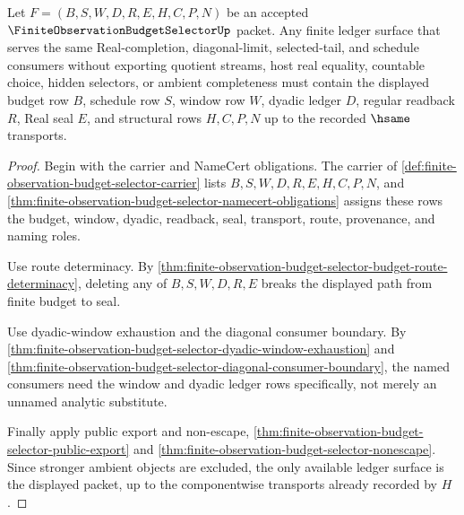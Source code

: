 \begin{theorem}
\label{thm:finite-observation-budget-selector-budget-ledger-minimality}
Let $F=(B,S,W,D,R,E,H,C,P,N)$ be an accepted $\FiniteObservationBudgetSelectorUp$ packet. Any finite ledger surface that serves the same Real-completion, diagonal-limit, selected-tail, and schedule consumers without exporting quotient streams, host real equality, countable choice, hidden selectors, or ambient completeness must contain the displayed budget row $B$, schedule row $S$, window row $W$, dyadic ledger $D$, regular readback $R$, Real seal $E$, and structural rows $H,C,P,N$ up to the recorded $\hsame$ transports.
\end{theorem}
\begin{proof}
Begin with the carrier and NameCert obligations. The carrier of \autoref{def:finite-observation-budget-selector-carrier} lists $B,S,W,D,R,E,H,C,P,N$, and \autoref{thm:finite-observation-budget-selector-namecert-obligations} assigns these rows the budget, window, dyadic, readback, seal, transport, route, provenance, and naming roles.

Use route determinacy. By \autoref{thm:finite-observation-budget-selector-budget-route-determinacy}, deleting any of $B,S,W,D,R,E$ breaks the displayed path from finite budget to seal.

Use dyadic-window exhaustion and the diagonal consumer boundary. By \autoref{thm:finite-observation-budget-selector-dyadic-window-exhaustion} and \autoref{thm:finite-observation-budget-selector-diagonal-consumer-boundary}, the named consumers need the window and dyadic ledger rows specifically, not merely an unnamed analytic substitute.

Finally apply public export and non-escape, \autoref{thm:finite-observation-budget-selector-public-export} and \autoref{thm:finite-observation-budget-selector-nonescape}. Since stronger ambient objects are excluded, the only available ledger surface is the displayed packet, up to the componentwise transports already recorded by $H$.
\end{proof}

